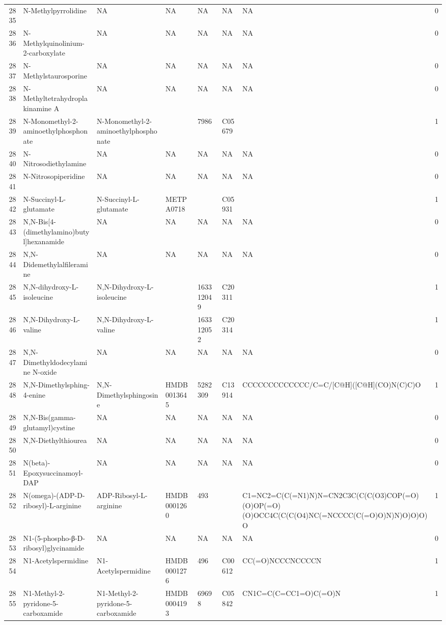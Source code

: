 \documentclass[a4paper]{article}
\begin{document}
\begin{longtable}{rlllllll}
  2835 & N-Methylpyrrolidine & NA & NA & NA & NA & NA & 0 \\ 
  2836 & N-Methylquinolinium-2-carboxylate & NA & NA & NA & NA & NA & 0 \\ 
  2837 & N-Methylstaurosporine & NA & NA & NA & NA & NA & 0 \\ 
  2838 & N-Methyltetrahydroplakinamine A & NA & NA & NA & NA & NA & 0 \\ 
  2839 & N-Monomethyl-2-aminoethylphosphonate & N-Monomethyl-2-aminoethylphosphonate &  & 7986 & C05679 &  & 1 \\ 
  2840 & N-Nitrosodiethylamine & NA & NA & NA & NA & NA & 0 \\ 
  2841 & N-Nitrosopiperidine & NA & NA & NA & NA & NA & 0 \\ 
  2842 & N-Succinyl-L-glutamate & N-Succinyl-L-glutamate & METPA0718 &  & C05931 &  & 1 \\ 
  2843 & N,N-Bis[4-(dimethylamino)butyl]hexanamide & NA & NA & NA & NA & NA & 0 \\ 
  2844 & N,N-Didemethylalfileramine & NA & NA & NA & NA & NA & 0 \\ 
  2845 & N,N-dihydroxy-L-isoleucine & N,N-Dihydroxy-L-isoleucine &  & 163312049 & C20311 &  & 1 \\ 
  2846 & N,N-Dihydroxy-L-valine & N,N-Dihydroxy-L-valine &  & 163312052 & C20314 &  & 1 \\ 
  2847 & N,N-Dimethyldodecylamine N-oxide & NA & NA & NA & NA & NA & 0 \\ 
  2848 & N,N-Dimethylsphing-4-enine & N,N-Dimethylsphingosine & HMDB0013645 & 5282309 & C13914 & CCCCCCCCCCCCC/C=C/[C@H]([C@H](CO)N(C)C)O & 1 \\ 
  2849 & N,N-Bis(gamma-glutamyl)cystine & NA & NA & NA & NA & NA & 0 \\ 
  2850 & N,N-Diethylthiourea & NA & NA & NA & NA & NA & 0 \\ 
  2851 & N(beta)-Epoxysuccinamoyl-DAP & NA & NA & NA & NA & NA & 0 \\ 
  2852 & N(omega)-(ADP-D-ribosyl)-L-arginine & ADP-Ribosyl-L-arginine & HMDB0001260 & 493 &  & C1=NC2=C(C(=N1)N)N=CN2C3C(C(C(O3)COP(=O)(O)OP(=O)(O)OCC4C(C(C(O4)NC(=NCCCC(C(=O)O)N)N)O)O)O)O & 1 \\ 
  2853 & N1-(5-phospho-β-D-ribosyl)glycinamide & NA & NA & NA & NA & NA & 0 \\ 
  2854 & N1-Acetylspermidine & N1-Acetylspermidine & HMDB0001276 & 496 & C00612 & CC(=O)NCCCNCCCCN & 1 \\ 
  2855 & N1-Methyl-2-pyridone-5-carboxamide & N1-Methyl-2-pyridone-5-carboxamide & HMDB0004193 & 69698 & C05842 & CN1C=C(C=CC1=O)C(=O)N & 1 \\ 

\end{longtable}
\end{document}
